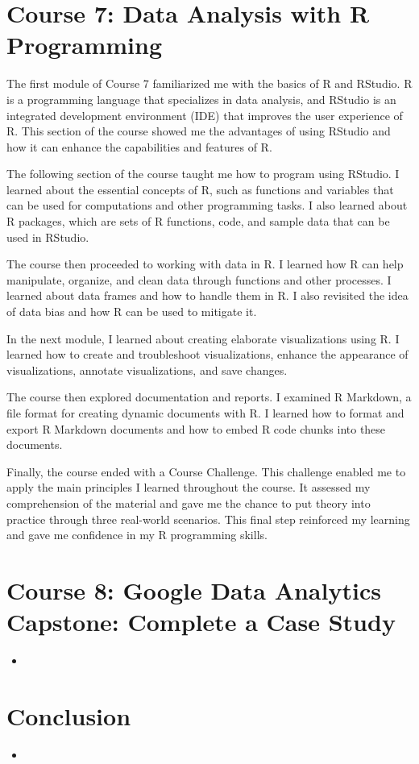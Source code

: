 \documentclass[]{article}
\begin{document}
\section{Course 7: Data Analysis with R Programming}
The first module of Course 7 familiarized me with the basics of R and RStudio. R is a programming language that specializes in data analysis, and RStudio is an integrated development environment (IDE) that improves the user experience of R. This section of the course showed me the advantages of using RStudio and how it can enhance the capabilities and features of R.

The following section of the course taught me how to program using RStudio. I learned about the essential concepts of R, such as functions and variables that can be used for computations and other programming tasks. I also learned about R packages, which are sets of R functions, code, and sample data that can be used in RStudio.

The course then proceeded to working with data in R. I learned how R can help manipulate, organize, and clean data through functions and other processes. I learned about data frames and how to handle them in R. I also revisited the idea of data bias and how R can be used to mitigate it.

In the next module, I learned about creating elaborate visualizations using R. I learned how to create and troubleshoot visualizations, enhance the appearance of visualizations, annotate visualizations, and save changes.

The course then explored documentation and reports. I examined R Markdown, a file format for creating dynamic documents with R. I learned how to format and export R Markdown documents and how to embed R code chunks into these documents.

Finally, the course ended with a Course Challenge. This challenge enabled me to apply the main principles I learned throughout the course. It assessed my comprehension of the material and gave me the chance to put theory into practice through three real-world scenarios. This final step reinforced my learning and gave me confidence in my R programming skills.

\section{Course 8: Google Data Analytics Capstone: Complete a Case Study}
\begin{itemize}
  \item
\end{itemize}
\section{Conclusion}
\begin{itemize}
  \item
\end{itemize}
\end{document}
